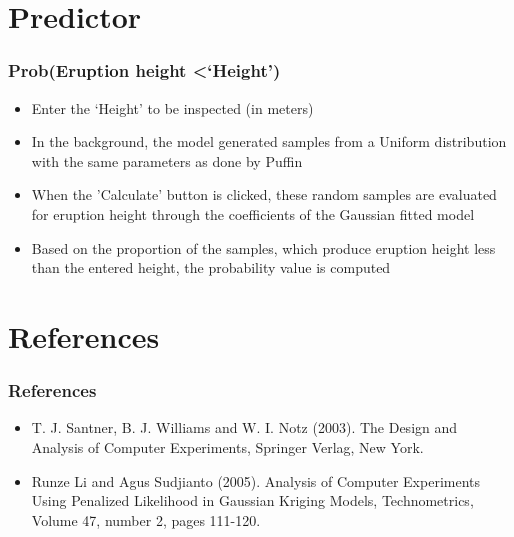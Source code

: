 \documentclass[10pt]{beamer}
\begin{document}
\section{Predictor}
\begin{frame}
\frametitle{Prob(Eruption height \textless `Height')}

\begin{itemize}
    \item Enter the `Height' to be inspected (in meters)
    \item In the background, the model generated samples from a Uniform distribution with the same parameters as done by Puffin
    \item When the 'Calculate' button is clicked, these random samples are evaluated for eruption height through the coefficients of the Gaussian fitted model
    \item Based on the proportion of the samples, which produce eruption height less than the entered height, the probability value is computed
\end{itemize}

\end{frame}




\section{References}
\begin{frame}
\frametitle{References}
\begin{itemize}
\item T. J. Santner, B. J. Williams and W. I. Notz (2003). The Design and Analysis of Computer Experiments, Springer Verlag, New York.
\item Runze Li and Agus Sudjianto (2005). Analysis of Computer Experiments Using Penalized Likelihood in Gaussian Kriging Models, Technometrics, Volume 47, number 2, pages 111-120.
\end{itemize}

\end{frame}





\begin{frame}
\Large
\begin{center}
\end{center}
\end{frame}
\end{document}
